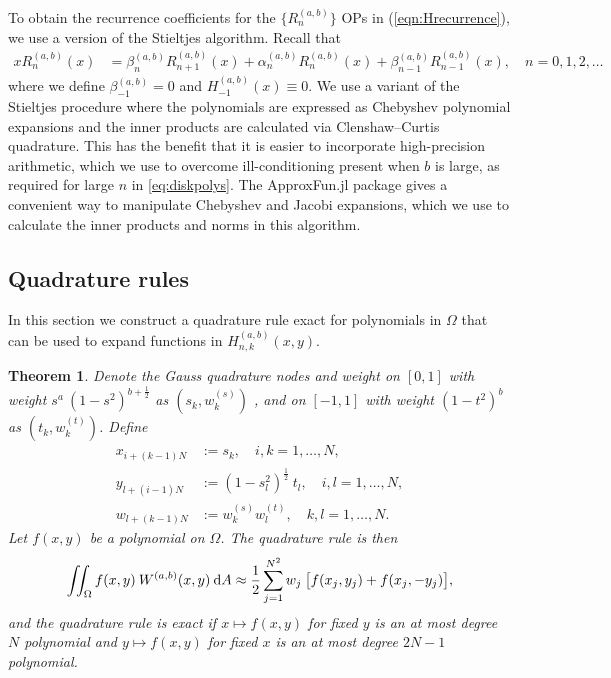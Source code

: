 \documentclass[11pt, oneside]{article}   	%
\newcommand{\half}{\frac{1}{2}}
\newcommand{\hdop}{H}
\newcommand{\hdopnkab}{\hdop_{n,k}^{(a,b)}}
\newcommand{\Wab}{{W^{(a,b)}}}
\newcommand{\genjac}{R}
\newtheorem{theorem}{Theorem}
\begin{document}
To obtain the recurrence coefficients for the $\{\genjac_n^{(a,b)}\}$ OPs in (\ref{eqn:Hrecurrence}), we use a version of the Stieltjes algorithm. Recall that
\begin{align*}
	x \genjac_n^{(a,b)}(x) &= \beta_n^{(a,b)} \genjac_{n+1}^{(a,b)}(x) + \alpha_n^{(a,b)} \genjac_n^{(a,b)}(x) + \beta_{n-1}^{(a,b)} \genjac_{n-1}^{(a,b)}(x), \quad n = 0,1,2,\dots
\end{align*}
where we define $\beta_{-1}^{(a,b)} = 0$ and $H_{-1}^{(a,b)}(x) \equiv 0$. We use a variant of the Stieltjes procedure \cite{gautschi1982generating} where the polynomials are expressed as Chebyshev polynomial expansions and the inner products are calculated via Clenshaw--Curtis quadrature. This has the benefit that it is easier to incorporate high-precision arithmetic, which we use to overcome ill-conditioning present when $b$ is large, as required for large $n$ in \eqref{eq:diskpolys}. The ApproxFun.jl \cite{ApproxFun} package gives a convenient way to manipulate Chebyshev and Jacobi expansions, which we use to calculate the inner products and norms in this algorithm.


\subsection{Quadrature rules}

In this section we construct a quadrature rule exact for polynomials in $\Omega$ that can be used to expand functions in $\hdopnkab(x,y)$. 

\begin{theorem}

Denote the  Gauss quadrature nodes and weight on \([0,1]\) with weight \(s^a \: (1-s^2)^{b+\half}\) as $(s_k,w_k^{(s)})$ , and
 on \([-1,1]\) with weight \((1-t^2)^b\) as $(t_k,w_k^{(t)})$. Define
\begin{align*}
x_{i+(k-1)N} &:= s_k, \quad i,k = 1,\dots,N, \\
y_{l+(i-1)N} &:= (1-s_l^2)^\half \: t_l, \quad i,l = 1,\dots,N, \\
w_{l+(k-1)N} &:= w_k^{(s)} w_l^{(t)}, \quad k,l = 1,\dots,N.
\end{align*}
Let $f(x,y)$ be a polynomial on $\Omega$. The quadrature rule is then
$$
\iint_\Omega f(x,y) \: \Wab(x,y) \: \D A \approx \half \sum_{j=1}^{N^2} w_j \: \big[ f(x_j, y_j) + f(x_j, -y_j) \big],
$$
and the quadrature rule is exact if $x \mapsto f(x,y)$ for fixed $y$ is an at most degree $N$ polynomial and $y \mapsto f(x,y)$ for fixed $x$ is an at most degree $2N-1$ polynomial.
\end{theorem}
\end{document}
